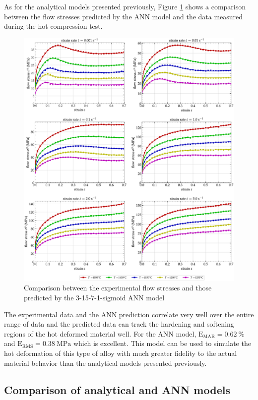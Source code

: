 \documentclass[twoside,english,1p,final,sort&compress]{elsarticle}
\theoremstyle{plain}
\DeclareRobustCommand{\RMSE}{\text{E}_\text{RMS}}
\DeclareRobustCommand{\MARE}{\text{E}_\text{MAR}}
\DeclareRobustCommand{\MPa}{\text{MPa}}
\begin{document}
As for the analytical models presented previously, Figure \ref{fig:CompExp-3-15-7-1-sigmoid} shows a comparison between the flow stresses predicted by the ANN model and the data measured during the hot compression test.
\begin{figure}[!ht]
\centering
\includegraphics[width=\columnwidth]
{Figures/CompExp-3-15-7-1-sigmoid}
\caption{Comparison between the experimental flow stresses and those predicted by the 3-15-7-1-sigmoid ANN model}
\label{fig:CompExp-3-15-7-1-sigmoid}
\end{figure}
The experimental data and the ANN prediction correlate very well over the entire range of data and the predicted data can track the hardening and softening regions of the hot deformed material well.
For the ANN model, $\MARE=0.62~\%$ and $\RMSE=0.38~\MPa$ which is excellent.
This model can be used to simulate the hot deformation of this type of alloy with much greater fidelity to the actual material behavior than the analytical models presented previously.

\subsection{Comparison of analytical and ANN models\label{sec:Comparison}}
\end{document}

